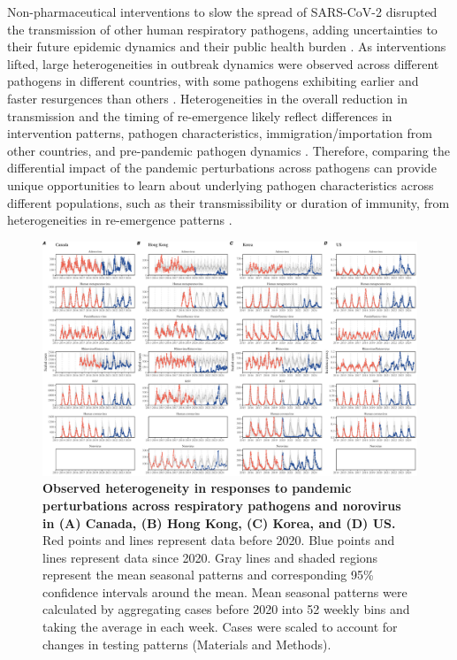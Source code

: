 \documentclass[12pt]{article}
\begin{document}
Non-pharmaceutical interventions to slow the spread of SARS-CoV-2 disrupted the transmission of other human respiratory pathogens, adding uncertainties to their future epidemic dynamics and their public health burden \citep{baker2020impact}.
As interventions lifted, large heterogeneities in outbreak dynamics were observed across different pathogens in different countries, with some pathogens exhibiting earlier and faster resurgences than others \citep{gomez2021uncertain,koltai2022determinants,park2024predicting}.
Heterogeneities in the overall reduction in transmission and the timing of re-emergence likely reflect differences in intervention patterns, pathogen characteristics, immigration/importation from other countries, and pre-pandemic pathogen dynamics \citep{perofsky2024impacts}.
Therefore, comparing the differential impact of the pandemic perturbations across pathogens can provide unique opportunities to learn about underlying pathogen characteristics across different populations, such as their transmissibility or duration of immunity, from heterogeneities in re-emergence patterns \citep{chow2023effects}.

\begin{figure}[!th]
\includegraphics[width=\textwidth]{../figure1/figure1.pdf}
\caption{
\textbf{Observed heterogeneity in responses to pandemic perturbations across respiratory pathogens and norovirus in (A) Canada, (B) Hong Kong, (C) Korea, and (D) US.}
Red points and lines represent data before 2020.
Blue points and lines represent data since 2020.
Gray lines and shaded regions represent the mean seasonal patterns and corresponding 95\% confidence intervals around the mean.
Mean seasonal patterns were calculated by aggregating cases before 2020 into 52 weekly bins and taking the average in each week.
Cases were scaled to account for changes in testing patterns (Materials and Methods).
}
\end{figure} 
\end{document}
